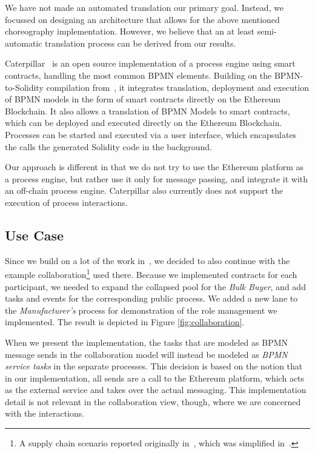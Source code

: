 \documentclass[runningheads]{llncs}
\begin{document}
We have not made an automated translation our primary goal.
Instead, we focussed on designing an architecture that allows for the above mentioned choreography implementation.
However, we believe that an at least semi-automatic translation process can be derived from our results.

Caterpillar~\cite{lopez2017caterpillar} is an open source implementation of a process engine using smart contracts, handling the most common BPMN elements.
Building on the BPMN-to-Solidity compilation from~\cite{weber2016untrusted}, it integrates translation, deployment and execution of BPMN models in the form of smart contracts directly on the Ethereum Blockchain.
It also allows a translation of BPMN Models to smart contracts, which can be deployed and executed directly on the Ethereum Blockchain.
Processes can be started and executed via a user interface, which encapsulates the calls the generated Solidity code in the background.

Our approach is different in that we do not try to use the Ethereum platform as a process engine, but rather use it only for message passing, and integrate it with an off-chain process engine.
Caterpillar also currently does not support the execution of process interactions.

\subsection{Use Case}

Since we build on a lot of the work in~\cite{weber2016untrusted}, we decided to also continue with the example collaboration\footnote{A supply chain scenario reported originally in~\cite{fdhila2015collaborative}, which was simplified in~\cite{weber2016untrusted}.} used there.
Because we implemented contracts for each participant, we needed to expand the collapsed pool for the \emph{Bulk Buyer}, and add tasks and events for the corresponding public process.
We added a new lane to the \emph{Manufacturer's} process for demonstration of the role management we implemented.
The result is depicted in Figure \ref{fig:collaboration}.

When we present the implementation, the tasks that are modeled as BPMN message sends in the collaboration model will instead be modeled as \emph{BPMN service tasks} in the separate processes.
This decision is based on the notion that in our implementation, all sends are a call to the Ethereum platform, which acts as the external service and takes over the actual messaging.
This implementation detail is not relevant in the collaboration view, though, where we are concerned with the interactions.
\end{document}
